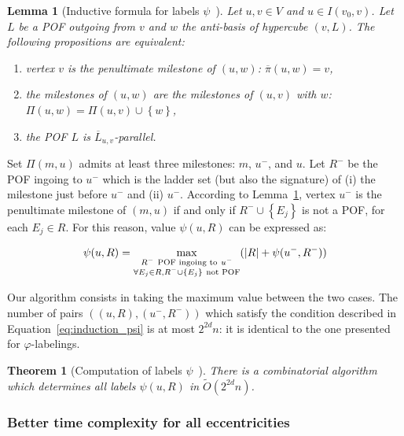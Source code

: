 \documentclass{article}
\newtheorem{theorem}{Theorem}
\newtheorem{lemma}{Lemma}
\newcommand{\set}[1]{\left\{ #1 \right\}}
\newcommand{\card}[1]{\left| #1 \right|}
\begin{document}
\begin{lemma}[Inductive formula for labels $\psi$~\cite{BeHa21}]
Let $u,v \in V$ and $u \in I(v_0,v)$. Let $L$ be a POF outgoing from $v$ and $w$ the anti-basis of hypercube $(v,L)$. The following propositions are equivalent:
\begin{enumerate}
\item[(i)] vertex $v$ is the penultimate milestone of $(u,w)$: $\overline{\pi}(u,w) = v$,
\item[(ii)] the milestones of $(u,w)$ are the milestones of $(u,v)$ with $w$: $\Pi(u,w) = \Pi(u,v) \cup \set{w}$,
\item[(iii)] the POF $L$ is $\overline{L}_{u,v}$-parallel.
\end{enumerate}
\label{le:penultimate}
\end{lemma}

Set $\Pi(m,u)$ admits at least three milestones: $m$, $u^-$, and $u$. Let $R^-$ be the POF ingoing to $u^-$ which is the ladder set (but also the signature) of (i) the milestone just before $u^-$ and (ii) $u^-$. According to Lemma~\ref{le:penultimate}, vertex $u^-$ is the penultimate milestone of $(m,u)$ if and only if $R^- \cup \set{E_j}$ is not a POF, for each $E_j \in R$. For this reason, value $\psi(u,R)$ can be expressed as:

\begin{equation}
\psi(u,R) = \max\limits_{\substack{R^- ~\mbox{\scriptsize{POF ingoing to}}~ u^- \\ \forall E_j \in R, R^- \cup \set{E_j} ~\mbox{\scriptsize{not POF}}}} (\card{R} + \psi(u^-,R^-))
\label{eq:induction_psi}
\end{equation}

Our algorithm consists in taking the maximum value between the two cases. The number of pairs $((u,R),(u^-,R^-))$ which satisfy the condition described in Equation~\eqref{eq:induction_psi} is at most $2^{2d}n$: it is identical to the one presented for $\varphi$-labelings.

\begin{theorem}[Computation of labels $\psi$~\cite{BeHa21}]
There is a combinatorial algorithm which determines all labels $\psi(u,R)$ in $\tilde{O}(2^{2d}n)$. 
\label{th:compute_psi}
\end{theorem}

\subsubsection{Better time complexity for all eccentricities} \label{subsubsec:ecc}
\end{document}
